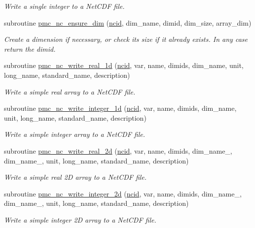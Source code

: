 \begin{DoxyCompactItemize}
\begin{DoxyCompactList}\small\item\em Write a single integer to a Net\+C\+DF file. \end{DoxyCompactList}\item 
subroutine \mbox{\hyperlink{namespacepmc__netcdf_aef9fac46c9e7632344fa29cfb6891f92}{pmc\+\_\+nc\+\_\+ensure\+\_\+dim}} (\mbox{\hyperlink{fractal_8_f90_a4e89f3f850921ff84a6dfce8b166ad50}{ncid}}, dim\+\_\+name, dimid, dim\+\_\+size, array\+\_\+dim)
\begin{DoxyCompactList}\small\item\em Create a dimension if necessary, or check its size if it already exists. In any case return the {\ttfamily dimid}. \end{DoxyCompactList}\item 
subroutine \mbox{\hyperlink{namespacepmc__netcdf_a8dc82ed2d6bf930ffd844ea41d821e4f}{pmc\+\_\+nc\+\_\+write\+\_\+real\+\_\+1d}} (\mbox{\hyperlink{fractal_8_f90_a4e89f3f850921ff84a6dfce8b166ad50}{ncid}}, var, name, dimids, dim\+\_\+name, unit, long\+\_\+name, standard\+\_\+name, description)
\begin{DoxyCompactList}\small\item\em Write a simple real array to a Net\+C\+DF file. \end{DoxyCompactList}\item 
subroutine \mbox{\hyperlink{namespacepmc__netcdf_ac0d23c48469031f1750e47f7742a78a5}{pmc\+\_\+nc\+\_\+write\+\_\+integer\+\_\+1d}} (\mbox{\hyperlink{fractal_8_f90_a4e89f3f850921ff84a6dfce8b166ad50}{ncid}}, var, name, dimids, dim\+\_\+name, unit, long\+\_\+name, standard\+\_\+name, description)
\begin{DoxyCompactList}\small\item\em Write a simple integer array to a Net\+C\+DF file. \end{DoxyCompactList}\item 
subroutine \mbox{\hyperlink{namespacepmc__netcdf_af7187da67199411890eafc1fa1cc0ab3}{pmc\+\_\+nc\+\_\+write\+\_\+real\+\_\+2d}} (\mbox{\hyperlink{fractal_8_f90_a4e89f3f850921ff84a6dfce8b166ad50}{ncid}}, var, name, dimids, dim\+\_\+name\+\_, dim\+\_\+name\+\_, unit, long\+\_\+name, standard\+\_\+name, description)
\begin{DoxyCompactList}\small\item\em Write a simple real 2D array to a Net\+C\+DF file. \end{DoxyCompactList}\item 
subroutine \mbox{\hyperlink{namespacepmc__netcdf_a948590db9b9b4f73c2da2cc1ed2af6aa}{pmc\+\_\+nc\+\_\+write\+\_\+integer\+\_\+2d}} (\mbox{\hyperlink{fractal_8_f90_a4e89f3f850921ff84a6dfce8b166ad50}{ncid}}, var, name, dimids, dim\+\_\+name\+\_, dim\+\_\+name\+\_, unit, long\+\_\+name, standard\+\_\+name, description)
\begin{DoxyCompactList}\small\item\em Write a simple integer 2D array to a Net\+C\+DF file. \end{DoxyCompactList}\end{DoxyCompactItemize}


